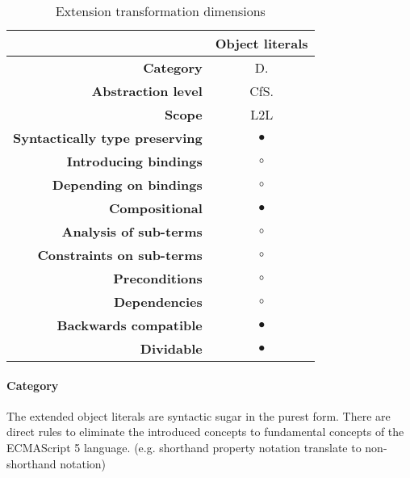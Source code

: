\begin{table}[h]
\centering
\caption{Extension transformation dimensions}
\label{object-literals-table}
\begin{tabular}{@{}rc@{}}
\toprule
                                       & \multicolumn{1}{l}{\textbf{Object literals}} \\ \midrule
\textbf{Category}                      & D.
\\
\textbf{Abstraction level}          & CfS.                          \\
\textbf{Scope}                         & L2L                               \\
\textbf{Syntactically type preserving} & $\bullet$                                          \\
\textbf{Introducing bindings}          & $\circ$                                          \\%
\textbf{Depending on bindings}         & $\circ$                                           \\
\textbf{Compositional}                 & $\bullet$                                          \\
\textbf{Analysis of sub-terms}          & $\circ$                                          \\
\textbf{Constraints on sub-terms}       & $\circ$                                           \\
\textbf{Preconditions}                 & $\circ$                                          \\
\textbf{Dependencies}                  & $\circ$                                           \\
\textbf{Backwards compatible}          & $\bullet$                                          \\
\textbf{Dividable}                     & $\bullet$                                           \\ \bottomrule
\end{tabular}
\end{table}

\paragraph{Category}
The extended object literals are syntactic sugar in the purest form. There are direct rules to eliminate the introduced concepts to fundamental concepts of the ECMAScript 5 language. (e.g. shorthand property notation translate to non-shorthand notation)

